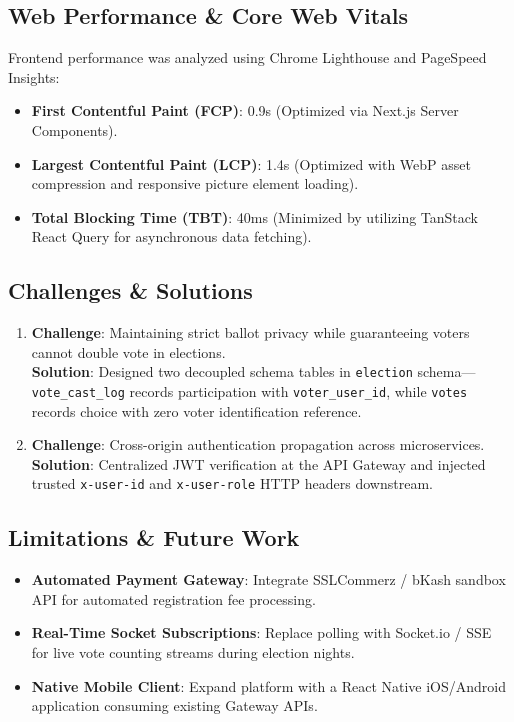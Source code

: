 \documentclass[12pt, a4paper]{article}
\begin{document}
\subsection{Web Performance \& Core Web Vitals}
Frontend performance was analyzed using Chrome Lighthouse and PageSpeed Insights:
\begin{itemize}
    \item \textbf{First Contentful Paint (FCP)}: 0.9s (Optimized via Next.js Server Components).
    \item \textbf{Largest Contentful Paint (LCP)}: 1.4s (Optimized with WebP asset compression and responsive picture element loading).
    \item \textbf{Total Blocking Time (TBT)}: 40ms (Minimized by utilizing TanStack React Query for asynchronous data fetching).
\end{itemize}

\subsection{Challenges \& Solutions}
\begin{enumerate}
    \item \textbf{Challenge}: Maintaining strict ballot privacy while guaranteeing voters cannot double vote in elections.\\
    \textbf{Solution}: Designed two decoupled schema tables in \texttt{election} schema---\texttt{vote\_cast\_log} records participation with \texttt{voter\_user\_id}, while \texttt{votes} records choice with zero voter identification reference.
    \item \textbf{Challenge}: Cross-origin authentication propagation across microservices.\\
    \textbf{Solution}: Centralized JWT verification at the API Gateway and injected trusted \texttt{x-user-id} and \texttt{x-user-role} HTTP headers downstream.
\end{enumerate}

\subsection{Limitations \& Future Work}
\begin{itemize}
    \item \textbf{Automated Payment Gateway}: Integrate SSLCommerz / bKash sandbox API for automated registration fee processing.
    \item \textbf{Real-Time Socket Subscriptions}: Replace polling with Socket.io / SSE for live vote counting streams during election nights.
    \item \textbf{Native Mobile Client}: Expand platform with a React Native iOS/Android application consuming existing Gateway APIs.
\end{itemize}
\end{document}
